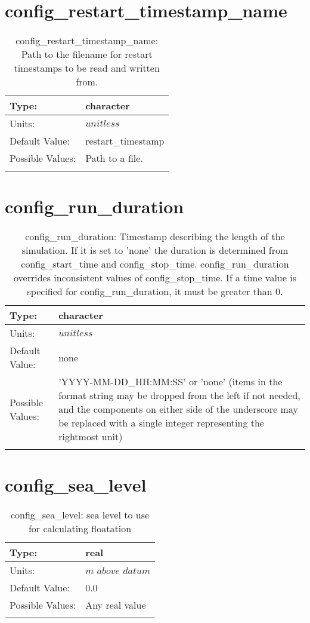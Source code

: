 \section[config\_restart\_timestamp\_name]{config\_restart\_timestamp\_name}
\label{sec:nm_sec_config_restart_timestamp_name}
\begin{center}
\begin{longtable}{| p{2.0in} || p{4.0in} |}
    \hline
    Type: & character \\
    \hline
    Units: & $unitless$ \\
    \hline
    Default Value: & restart\_timestamp \\
    \hline
    Possible Values: & Path to a file. \\
    \hline
    \caption{config\_restart\_timestamp\_name: Path to the filename for restart timestamps to be read and written from.}
\end{longtable}
\end{center}
\section[config\_run\_duration]{config\_run\_duration}
\label{sec:nm_sec_config_run_duration}
\begin{center}
\begin{longtable}{| p{2.0in} || p{4.0in} |}
    \hline
    Type: & character \\
    \hline
    Units: & $unitless$ \\
    \hline
    Default Value: & none \\
    \hline
    Possible Values: & 'YYYY-MM-DD\_HH:MM:SS' or 'none' (items in the format string may be dropped from the left if not needed, and the components on either side of the underscore may be replaced with a single integer representing the rightmost unit) \\
    \hline
    \caption{config\_run\_duration: Timestamp describing the length of the simulation. If it is set to 'none' the duration is determined from config\_start\_time and config\_stop\_time. config\_run\_duration overrides inconsistent values of config\_stop\_time. If a time value is specified for config\_run\_duration, it must be greater than 0.}
\end{longtable}
\end{center}
\section[config\_sea\_level]{config\_sea\_level}
\label{sec:nm_sec_config_sea_level}
\begin{center}
\begin{longtable}{| p{2.0in} || p{4.0in} |}
    \hline
    Type: & real \\
    \hline
    Units: & $m$ $above$ $datum$ \\
    \hline
    Default Value: & 0.0 \\
    \hline
    Possible Values: & Any real value \\
    \hline
    \caption{config\_sea\_level: sea level to use for calculating floatation}
\end{longtable}
\end{center}
